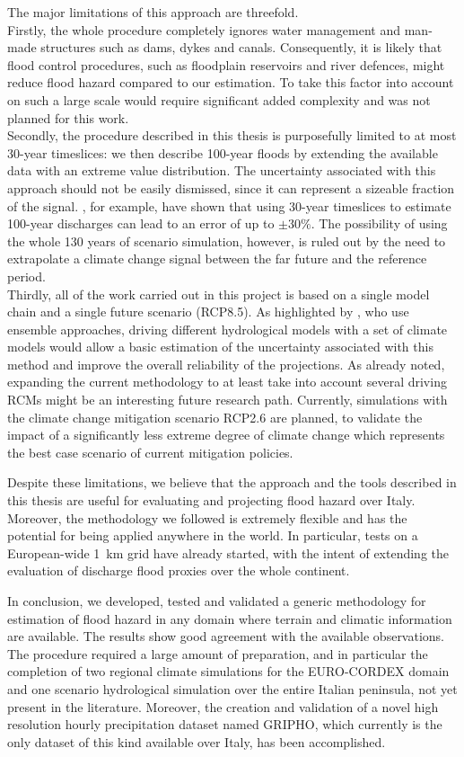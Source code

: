 The major limitations of this approach are threefold.\\
Firstly, the whole procedure completely ignores water management and man-made structures such as dams, dykes and canals.
Consequently, it is likely that flood control procedures, such as floodplain reservoirs and river defences, might reduce flood hazard compared to our estimation.
To take this factor into account on such a large scale would require significant added complexity and was not planned for this work.\\
Secondly, the procedure described in this thesis is purposefully limited to at most 30-year timeslices: we then describe 100-year floods by extending the available data with an extreme value distribution.
The uncertainty associated with this approach should not be easily dismissed, since it can represent a sizeable fraction of the signal. \citet{Schulz2016}, for example, have shown that using 30-year timeslices to estimate 100-year discharges can lead to an error of up to $\pm 30\%$.
The possibility of using the whole 130 years of scenario simulation, however, is ruled out by the need to extrapolate a climate change signal between the far future and the reference period.\\
Thirdly, all of the work carried out in this project is based on a single model chain and a single future scenario (RCP8.5).
As highlighted by \citet{Rojas2012,Dankers2009}, who use ensemble approaches, driving different hydrological models with a set of climate models would allow a basic estimation of the uncertainty associated with this method and improve the overall reliability of the projections.
As already noted, expanding the current methodology to at least take into account several driving RCMs might be an interesting future research path.
Currently, simulations with the climate change mitigation scenario RCP2.6 are planned, to validate the impact of a significantly less extreme degree of climate change which represents the best case scenario of current mitigation policies.

Despite these limitations, we believe that the approach and the tools described in this thesis are useful for evaluating and projecting flood hazard over Italy.
Moreover, the methodology we followed is extremely flexible and has the potential for being applied anywhere in the world.
In particular, tests on a European-wide \SI{1}{\kilo\meter} grid have already started, with the intent of extending the evaluation of discharge flood proxies over the whole continent.

In conclusion, we developed, tested and validated a generic methodology for estimation of flood hazard in any domain where terrain and climatic information are available. The results show good agreement with the available observations.
The procedure required a large amount of preparation, and in particular the completion of two regional climate simulations for the EURO-CORDEX domain and one scenario hydrological simulation over the entire Italian peninsula, not yet present in the literature.
Moreover, the creation and validation of a novel high resolution hourly precipitation dataset named GRIPHO, which currently is the only dataset of this kind available over Italy, has been accomplished.

